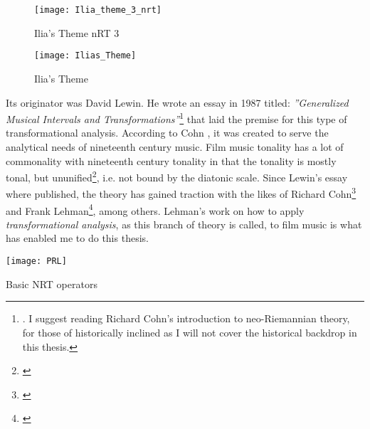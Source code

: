 \begin{figure}[h!]
\center
\texttt{[image: Ilia\_theme\_3\_nrt]}
	\caption{Ilia's Theme nRT 3}
	\label{Ilia_theme_3_nrt}
\end{figure}

\begin{figure*}
\center
\texttt{[image: Ilias\_Theme]}
	\caption{Ilia's Theme}
	\label{Ilias_Theme}
\end{figure*}

Its originator was David Lewin. He wrote an essay in 1987 titled: \textit{''Generalized Musical Intervals and Transformations''}\footnote{\citealt{lewin_generalized_2007}. I suggest reading Richard Cohn's introduction to neo-Riemannian theory, \citealt{cohn_introduction_1998} for those of historically inclined as I will not cover the historical backdrop in this thesis.} that laid the premise for this type of transformational analysis. According to Cohn \citep{cohn_introduction_1998}, it was created to serve the analytical needs of nineteenth century music. Film music tonality has a lot of commonality with nineteenth century tonality in that the tonality is mostly tonal, but ununified\footnote{\citealt[p.2]{cohn_introduction_1998}}, i.e. not bound by the diatonic scale. Since Lewin's essay where published, the theory has gained traction with the likes of Richard Cohn\footnote{\citealt{cohn_maximally_1996}} and Frank Lehman\footnote{\citealt{lehman_reading_2012}}, among others. Lehman's work on how to apply \textit{transformational analysis}, as this branch of theory is called, to film music is what has enabled me to do this thesis. 

\begin{marginfigure}
\texttt{[image: PRL]}
\caption{Basic NRT operators}
\label{fg:prl}
\end{marginfigure}

